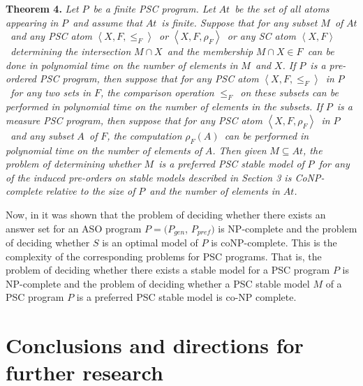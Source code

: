 \documentclass[letterpaper]{article}\usepackage{aaai}
\begin{document}
\textbf{Theorem 4. }\textit{Let }$P$\textit{\ be a finite PSC program. Let
}$At$\textit{\ be the set of all atoms appearing in }$P$\textit{\ and assume
that }$At$\textit{\ is finite. Suppose that for any subset }$M$\textit{\ of
}$At$\textit{\ and any PSC atom }$\left\langle X,F,\leq_{F}\right\rangle
$\textit{\ or }$\left\langle X,F,\rho_{F}\right\rangle $\textit{\ or any SC
atom }$\left\langle X,F\right\rangle $\textit{\ determining the intersection
}$M\cap X$\textit{\ and the membership }$M\cap X\in F$\textit{\ can be done in
polynomial time on the number of elements in }$M$\textit{\ and }$X$\textit{.
If }$P$\textit{\ is a pre-ordered PSC program, then suppose that for any PSC
atom }$\left\langle X,F,\leq_{F}\right\rangle $\textit{\ in }$P$\textit{\ for
any two sets in }$F$\textit{, the comparison operation }$\leq_{F}$\textit{\ on
these subsets can be performed in polynomial time on the number of elements in
the subsets. If }$P$\textit{\ is a measure PSC program, then suppose that for
any PSC atom }$\left\langle X,F,\rho_{F}\right\rangle $\textit{\ in }$P$\textit{\ and any subset }$A$\textit{\ of }$F$\textit{, the computation
}$\rho_{F}\left(  A\right)  $\textit{\ can be performed in polynomial time on
the number of elements of }$A$\textit{. Then given }$M\subseteq At$\textit{,
the problem of determining whether }$M$\textit{\ is a preferred PSC stable
model of }$P$\textit{\ for any of the induced pre-orders on stable models
described in Section 3 is CoNP-complete relative to the size of }$P$\textit{\ and the number of elements in }$At$\textit{.} \newline

Now, in \cite{BNT03} it was shown that the problem of deciding whether there
exists an answer set for an ASO program $P=(P_{gen}$, $P_{pref})$ is
NP-complete and the problem of deciding whether $S$ is an optimal model of $P
$ is coNP-complete. This is the complexity of the corresponding problems for
PSC programs. That is, the problem of deciding whether there exists a stable
model for a PSC program $P$ is NP-complete and the problem of deciding whether
a PSC stable model $M$ of a PSC program $P$ is a preferred PSC stable model is
co-NP complete.

\section{Conclusions and directions for further research}
\end{document}
